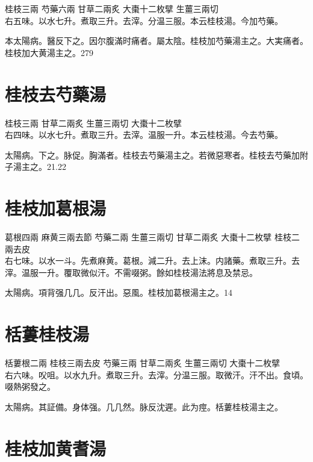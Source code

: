 \documentclass[b5paper,twoside,zihao=-4,UTF8]{ctexbook}
\begin{document}
桂枝{\scriptsize 三兩} 芍藥{\scriptsize 六兩} 甘草{\scriptsize 二兩炙} 大棗{\scriptsize 十二枚擘} 生薑{\scriptsize 三兩切}\\
右五味。以水七升。煮取三升。去滓。分温三服。本云桂枝湯。今加芍藥。

{本}太陽病。醫反下之。因尔腹滿时痛者。屬太陰。桂枝加芍藥湯主之。大実痛者。桂枝加大黄湯主之。279

\section{桂枝去芍藥湯}

桂枝{\scriptsize 三兩} 甘草{\scriptsize 二兩炙} 生薑{\scriptsize 三兩切} 大棗{\scriptsize 十二枚擘}\\
右四味。以水七升。煮取三升。去滓。温服一升。本云桂枝湯。今去芍藥。

太陽病。下之。脉促。胸滿者。桂枝去芍藥湯主之。若微{惡}寒者。桂枝去芍藥加附子湯主之。21.22

\section{桂枝加葛根湯}

葛根{\scriptsize 四兩} 麻黄{\scriptsize 三兩去節} 芍藥{\scriptsize 二兩} 生薑{\scriptsize 三兩切} 甘草{\scriptsize 二兩炙} 大棗{\scriptsize 十二枚擘} 桂枝{\scriptsize 二兩去皮}\\
右七味。以水一斗。先煮麻黄。葛根。減二升。去上沫。内諸藥。煮取三升。去滓。温服一升。覆取微似汗。不需啜粥。餘如桂枝湯法將息及禁忌。

太陽病。項背强几几。反汗出。惡風。桂枝{加葛根}湯主之。14

\section{栝蔞桂枝湯}

栝蔞根{\scriptsize 二兩} 桂枝{\scriptsize 三兩去皮} 芍藥{\scriptsize 三兩} 甘草{\scriptsize 二兩炙} 生薑{\scriptsize 三兩切} 大棗{\scriptsize 十二枚擘}\\
右六味。㕮咀。以水九升。煮取三升。去滓。分温三服。取微汗。汗不出。食頃。啜熱粥發之。

太陽病。其証備。身体强。几几然。脉反沈遲。此为痙。栝蔞桂枝湯主之。

\section{桂枝加黄耆湯}
\end{document}
